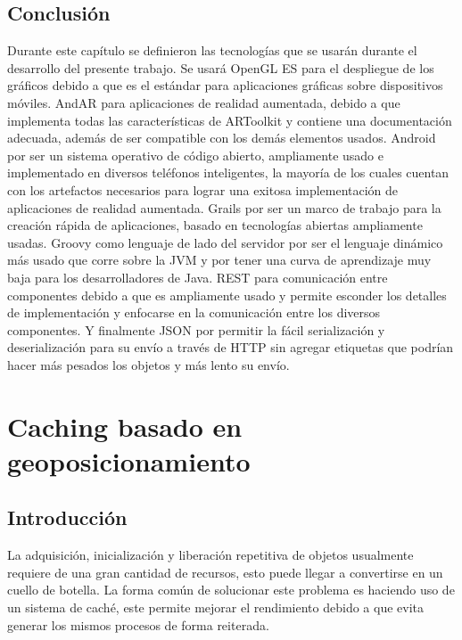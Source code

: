 \documentclass[12pt,a4paper,spanish,openany]{book}
\begin{document}
\section{Conclusión}
Durante este capítulo se definieron las tecnologías que se usarán durante el
desarrollo del presente trabajo.
Se usará OpenGL ES para el despliegue de los gráficos debido a que es el
estándar para aplicaciones gráficas sobre dispositivos móviles.
AndAR para aplicaciones de realidad aumentada, debido a que implementa todas las
características de ARToolkit y contiene una documentación adecuada, además de
ser compatible con los demás elementos usados.
Android por ser un sistema operativo de código abierto, ampliamente usado e
implementado en diversos teléfonos inteligentes, la mayoría de los cuales
cuentan con los artefactos necesarios para lograr una exitosa implementación de
aplicaciones de realidad aumentada.
Grails por ser un marco de trabajo para la creación rápida de aplicaciones,
basado en tecnologías abiertas ampliamente usadas.
Groovy como lenguaje de lado del servidor por ser el lenguaje dinámico más usado
que corre sobre la JVM y por tener una curva de aprendizaje muy baja para los
desarrolladores de Java.
REST para comunicación entre componentes debido a que es ampliamente usado y
permite esconder los detalles de implementación y enfocarse en la comunicación
entre los diversos componentes.
Y finalmente JSON por permitir la fácil serialización y deserialización para su
envío a través de HTTP sin agregar etiquetas que podrían hacer más pesados los
objetos y más lento su envío.









\chapter{Caching basado en geoposicionamiento}

\section{Introducción}


La adquisición, inicialización y liberación repetitiva de objetos
usualmente requiere de una gran cantidad de recursos, esto puede llegar a
convertirse en un cuello de botella. La forma común de solucionar este problema
es haciendo uso de un sistema de caché, este permite mejorar el
rendimiento debido a que evita generar los mismos procesos de forma
reiterada.
\end{document}
